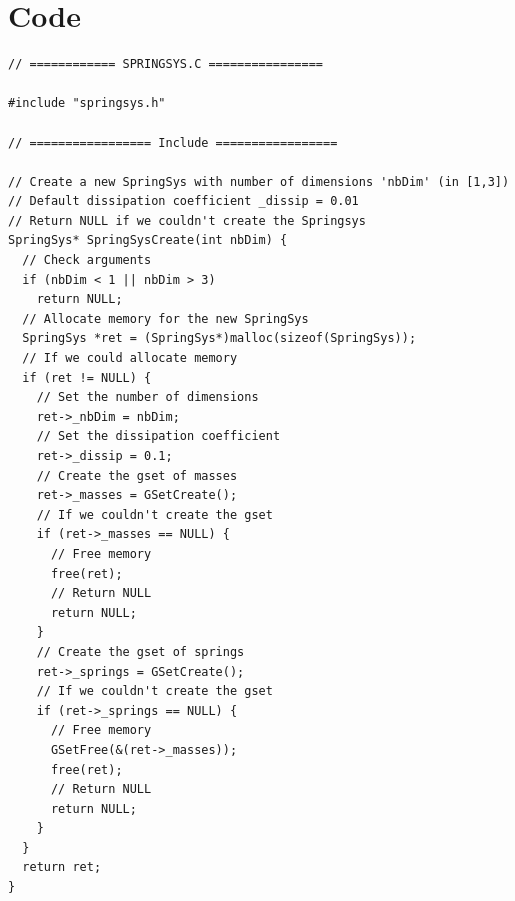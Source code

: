 \documentclass[12pt, a4paper]{article}
\begin{document}
\section{Code}

\begin{scriptsize}
\begin{ttfamily}
\begin{lstlisting}
// ============ SPRINGSYS.C ================

#include "springsys.h"

// ================= Include =================

// Create a new SpringSys with number of dimensions 'nbDim' (in [1,3])
// Default dissipation coefficient _dissip = 0.01
// Return NULL if we couldn't create the Springsys
SpringSys* SpringSysCreate(int nbDim) {
  // Check arguments
  if (nbDim < 1 || nbDim > 3)
    return NULL;
  // Allocate memory for the new SpringSys
  SpringSys *ret = (SpringSys*)malloc(sizeof(SpringSys));
  // If we could allocate memory
  if (ret != NULL) {
    // Set the number of dimensions
    ret->_nbDim = nbDim;
    // Set the dissipation coefficient
    ret->_dissip = 0.1;
    // Create the gset of masses
    ret->_masses = GSetCreate();
    // If we couldn't create the gset
    if (ret->_masses == NULL) {
      // Free memory
      free(ret);
      // Return NULL
      return NULL;
    }
    // Create the gset of springs
    ret->_springs = GSetCreate();
    // If we couldn't create the gset
    if (ret->_springs == NULL) {
      // Free memory
      GSetFree(&(ret->_masses));
      free(ret);
      // Return NULL
      return NULL;
    }
  }
  return ret;
}


\end{lstlisting}
\end{ttfamily}
\end{scriptsize}
\end{document}
